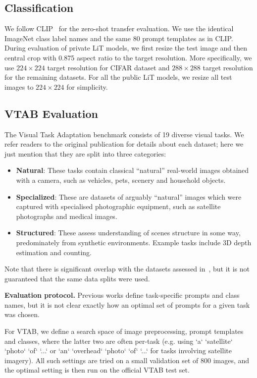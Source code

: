 \subsection{Classification}

We follow CLIP~\cite{clip} for the zero-shot transfer evaluation. We use the identical ImageNet class label names and the same 80 prompt templates as in CLIP.
During evaluation of private LiT models, we first resize the test image and then central crop with 0.875 aspect ratio to the target resolution. More specifically, we use $224\times224$ target resolution for CIFAR dataset and $288\times288$ target resolution for the remaining datasets.
For all the public LiT models, we resize all test images to $224\times224$ for simplicity.


\subsection{VTAB Evaluation}
\label{appendix:vtab}
The Visual Task Adaptation benchmark\cite{vtab} consists of 19 diverse visual tasks. We refer readers to the original publication for details about each dataset; here we just mention that they are split into three categories:
\begin{itemize}
    \item \textbf{Natural}: These tasks contain classical “natural” real-world images obtained with a camera, such as vehicles, pets, scenery and household objects.
    \item \textbf{Specialized}: These are datasets of arguably “natural” images which were captured with specialised photographic equipment, such as satellite photographs and medical images.
    \item \textbf{Structured}: These assess understanding of scenes structure in some way, predominately from synthetic environments. Example tasks include 3D depth estimation and counting.
\end{itemize}
Note that there is significant overlap with the datasets assessed in~\cite{clip}, but it is not guaranteed that the same data splits were used.

\textbf{Evaluation protocol.} 
Previous works\cite{clip} define task-specific prompts and class names, but it is not clear exactly how an optimal set of prompts for a given task was chosen.

For VTAB, we define a search space of image preprocessing, prompt templates and classes, where the latter two are often per-task (e.g. using `a` `satellite` `photo` `of` `...` or `an` `overhead` `photo` `of` `...` for tasks involving satellite imagery). All such settings are tried on a small validation set of 800 images, and the optimal setting is then run on the official VTAB test set.

